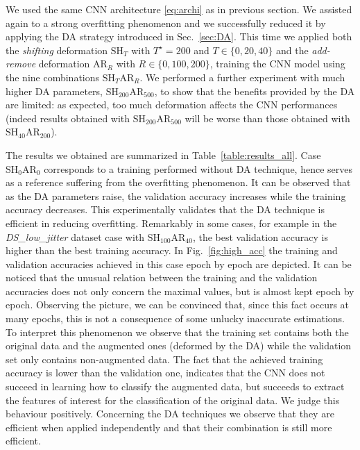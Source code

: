 We used the same CNN architecture \eqref{eq:archi} as in previous section. We assisted again to a strong overfitting phenomenon and we successfully reduced it by applying the DA strategy introduced in Sec.~\ref{sec:DA}. This time we applied both the \emph{shifting} deformation $\mathrm{SH}_T$ with $T^\star = 200$ and $T\in\{0,20,40\}$ and the \emph{add-remove} deformation $\mathrm{AR}_R$ with $R\in \{0,100,200\}$, training the CNN model using the nine combinations $\mathrm{SH}_T\mathrm{AR}_R$. We performed a further experiment with much higher DA parameters, \ie $\mathrm{SH}_{200}\mathrm{AR}_{500}$, to show that the benefits provided by the DA are limited: as expected, too much deformation affects the CNN performances (indeed results obtained with $\mathrm{SH}_{200}\mathrm{AR}_{500}$ will be worse than those obtained with \eg $\mathrm{SH}_{40}\mathrm{AR}_{200}$).





The results we obtained are summarized in Table~\ref{table:results_all}. Case $\mathrm{SH}_0\mathrm{AR}_0$ corresponds to a training performed without DA technique, hence serves as a reference suffering from the overfitting phenomenon. It can be observed that as the DA parameters raise, the validation accuracy increases while the training accuracy decreases. This experimentally validates that the DA technique is efficient in reducing overfitting. Remarkably in some cases, for example in the \emph{DS\_low\_jitter} dataset case with $\mathrm{SH}_{100}\mathrm{AR}_{40}$, the best validation accuracy is higher than the best training accuracy. In Fig.~\ref{fig:high_acc} the training and validation accuracies achieved in this case epoch by epoch are depicted. It can be noticed that the unusual relation between the training and the validation accuracies does not only concern the maximal values, but is almost kept epoch by epoch. Observing the picture, we can be convinced that, since this fact occurs at many epochs, this is not a consequence of some unlucky inaccurate estimations. To interpret this phenomenon we observe that the training set contains both the original data and the augmented ones (\ie deformed by the DA) while the validation set only contains non-augmented data.  The fact that the achieved training accuracy  is lower than the validation one, indicates that the CNN does not succeed in learning how to classify the augmented data, but succeeds to extract the features of interest for the classification of the original data.  We judge this behaviour positively. Concerning the DA techniques we observe that they are efficient when applied independently and that their combination is still more efficient.

